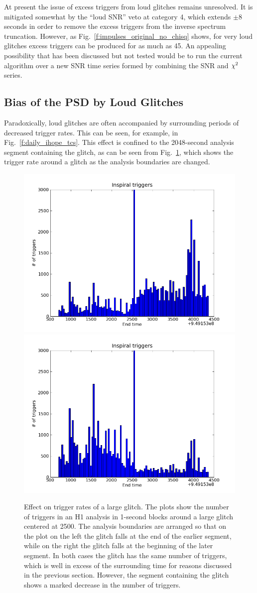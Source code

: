 At present the issue of excess triggers from loud glitches remains
unresolved.  It is mitigated somewhat by the ``loud SNR'' veto at
category 4, which extends $\pm 8$ seconds in order to remove the
excess triggers from the inverse spectrum truncation.  However, as
Fig.~\ref{f:impulses_original_no_chisq} shows, for very loud
glitches excess triggers can be produced for as much as 45.  An
appealing possibility that has been discussed but not tested would be
to run the current algorithm over a new SNR time series formed by
combining the SNR and $\chi^2$ series.

\subsection{Bias of the PSD by Loud Glitches}
\label{ssec:sarlacc}

Paradoxically, loud glitches are often accompanied by surrounding
periods of decreased trigger rates.  This can be seen, for example, in
Fig.~\ref{f:daily_ihope_tcs}.  This effect is confined to the
2048-second analysis segment containing the glitch, as can be seen
from Fig.~\ref{f:move_glitch}, which shows the trigger rate around a
glitch as the analysis boundaries are changed.

\begin{figure}
  \includegraphics[width=0.5\linewidth]{figures/detchar/H1-endtime_hist_ORIG}
  \includegraphics[width=0.5\linewidth]{figures/detchar/H1-endtime_hist_RESEG}
  \caption[Effect on trigger rates of a large glitch] {
  \label{f:move_glitch}
Effect on trigger rates of a large glitch.  The plots show the number
of triggers in an H1 analysis in 1-second blocks around a large glitch
centered at 2500.  The analysis boundaries are arranged so that on the
plot on the left the glitch falls at the end of the earlier segment,
while on the right the glitch falls at the beginning of the later
segment.  In both cases the glitch has the same number of triggers, 
which is well in excess of the surrounding time for reasons discussed
in the previous section.  However, the segment containing the glitch
shows a marked decrease in the number of triggers.
}
\end{figure}%

